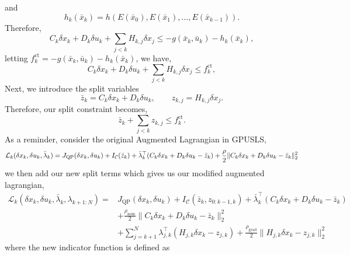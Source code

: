 \documentclass{article}
\begin{document}
and
\begin{equation}
    h_k(\bar x_k) = h(E(\bar x_0), E(\bar x_1), \ldots, E(\bar x_{k-1})).
\end{equation}
Therefore, 
\begin{equation}
    C_k \delta x_k + D_k \delta u_k  + \sum_{j < k} H_{k,j} \delta x_j \leq - g(\bar x_k, \bar u_k)  - h_k(\bar x_k),
\end{equation}
letting $f_k^\text{ct} = -g(\bar x_k, \bar u_k) - h_k(\bar x_k)$, we have,
\begin{equation}
    C_k \delta x_k + D_k \delta u_k  + \sum_{j < k} H_{k,j} \delta x_j \leq f^\text{ct}_k,
\end{equation}
Next, we introduce the split variables
\begin{equation}
    \bar z_k = C_k \delta x_k + D_k \delta u_k, \qquad z_{k,j} = H_{k,j} \delta x_j.
\end{equation}
Therefore, our split constraint becomes,
\begin{equation}
    \bar z_k + \sum_{j < k} z_{k,j} \leq f_k^{\text{ct}}.
\end{equation}
As a reminder, consider the original Augmented Lagrangian in GPUSLS,
\begin{equation}
        \mathcal{L}_{k}(\delta x_k, \delta u_k, \bar \lambda_k) = J_\text{QP}(\delta x_k, \delta u_k) + I_\mathcal{C}(\bar z_k)
        +
        \bar \lambda_k^\top (C_k \delta x_k + D_k \delta u_k - \bar z_k)
        +
        \frac{\rho}{2} \| C_k \delta x_k + D_k \delta u_k - \bar z_k \|^2_2 \\
\end{equation}
we then add our new split terms which gives us our modified augmented lagrangian,
\begin{equation}
    \begin{aligned}
        \mathcal{L}_{k}(\delta x_k, \delta u_k, \bar \lambda_k, \lambda_{k+1:N}) = & J_\text{QP}(\delta x_k, \delta u_k) + I_\mathcal{C}(\bar z_k, z_{0:k-1, k})
        +
        \bar \lambda_k^\top (C_k \delta x_k + D_k \delta u_k - \bar z_k)
        \\ & +
        \frac{\rho_{\text{nom}}}{2} \| C_k \delta x_k + D_k \delta u_k - \bar z_k \|^2_2 \\
        & + \sum_{j = k + 1}^N \lambda_{j,k}^\top (H_{j,k} \delta x_k - z_{j,k}) + \frac{\rho_{\text{grad}}}{2} \| H_{j,k} \delta x_k - z_{j,k} \|_2^2
    \end{aligned}
\end{equation}
where the new indicator function is defined as
\end{document}
